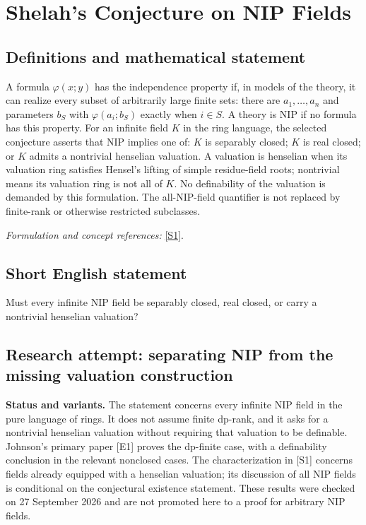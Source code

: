 \documentclass[11pt]{article}
\begin{document}
\section*{\texorpdfstring{Shelah's Conjecture on NIP Fields}{Shelah's Conjecture on NIP Fields}}\label{statement}
\subsection{Definitions and mathematical statement}
A formula $\varphi(x;y)$ has the independence property if, in models of the theory, it can realize every subset of arbitrarily large finite sets: there are $a_1,\ldots,a_n$ and parameters $b_S$ with $\varphi(a_i;b_S)$ exactly when $i\in S$. A theory is NIP if no formula has this property. For an infinite field $K$ in the ring language, the selected conjecture asserts that NIP implies one of: $K$ is separably closed; $K$ is real closed; or $K$ admits a nontrivial henselian valuation. A valuation is henselian when its valuation ring satisfies Hensel's lifting of simple residue-field roots; nontrivial means its valuation ring is not all of $K$. No definability of the valuation is demanded by this formulation. The all-NIP-field quantifier is not replaced by finite-rank or otherwise restricted subclasses.
\par\smallskip\textit{Formulation and concept references:} \href{https://arxiv.org/abs/1911.00309}{[S1]}.

\subsection{Short English statement}
Must every infinite NIP field be separably closed, real closed, or carry a nontrivial henselian valuation?
\subsection{Research attempt: separating NIP from the missing valuation construction}
\textbf{Status and variants.} The statement concerns every infinite NIP field in the pure language of rings. It does not assume finite dp-rank, and it asks for a nontrivial henselian valuation without requiring that valuation to be definable. Johnson's primary paper [E1] proves the dp-finite case, with a definability conclusion in the relevant nonclosed cases. The characterization in [S1] concerns fields already equipped with a henselian valuation; its discussion of all NIP fields is conditional on the conjectural existence statement. These results were checked on 27 September 2026 and are not promoted here to a proof for arbitrary NIP fields.
\end{document}
